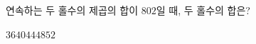 연속하는 두 홀수의 제곱의 합이 $802$일 때, 두 홀수의 합은?
\begin{choices32}{$36$}{$40$}{$44$}{$48$}{$52$}\end{choices32}
